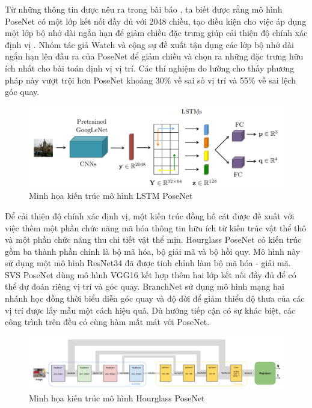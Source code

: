 Từ những thông tin được nêu ra trong bài báo \cite{kendall2016posenet}, ta biết được rằng mô hình PoseNet có một lớp kết nối đầy đủ với 2048 chiều, tạo điều kiện cho việc áp dụng một lớp bộ nhớ dài ngắn hạn để giảm chiều đặc trưng giúp cải thiện độ chính xác định vị \cite{walch2017imagebased, wang2019atloc}. Nhóm tác giả Watch và cộng sự \cite{walch2017imagebased} đề xuất tận dụng các lớp bộ nhớ dài ngắn hạn lên đầu ra của PoseNet để giảm chiều và chọn ra những đặc trưng hữu ích nhất cho bài toán định vị vị trí. Các thí nghiệm đo lường cho thấy phương pháp này vượt trội hơn PoseNet khoảng 30\% về sai số vị trí và 55\% về sai lệch góc quay.
\begin{figure}[H]
    \centering
    \includegraphics[width=\textwidth]{pics/Chapter2/LSTM_PoseNet.png}
    \caption{Minh họa kiến trúc mô hình LSTM PoseNet \cite{walch2017imagebased}}
\end{figure}
Để cải thiện độ chính xác định vị, một kiến trúc đồng hồ cát được đề xuất với việc thêm một phần chức năng mã hóa thông tin hữu ích từ kiến trúc vật thể thô và một phần chức năng thu chi tiết vật thể mịn. Hourglass PoseNet \cite{melekhov2017imagebased} có kiến trúc gồm ba thành phần chính là bộ mã hóa, bộ giải mã và bộ hồi quy. Mô hình này sử dụng một mô hình ResNet34 đã được tinh chỉnh làm bộ mã hóa - giải mã. SVS PoseNet \cite{inproceedings} dùng mô hình VGG16 kết hợp thêm hai lớp kết nối đầy đủ để có thể dự đoán riêng vị trí và góc quay. BranchNet \cite{7989663} sử dụng mô hình mạng hai nhánh học đồng thời biểu diễn góc quay và độ dời để giảm thiểu độ thưa của các vị trí được lấy mẫu một cách hiệu quả. Dù hướng tiếp cận có sự khác biệt, các công trình trên đều có cùng hàm mất mát với PoseNet.
\begin{figure}[H]
    \centering
    \includegraphics[width=\textwidth]{pics/Chapter2/hourglass_PoseNet.png}
    \caption{Minh họa kiến trúc mô hình Hourglass PoseNet \cite{melekhov2017imagebased}}
\end{figure}

